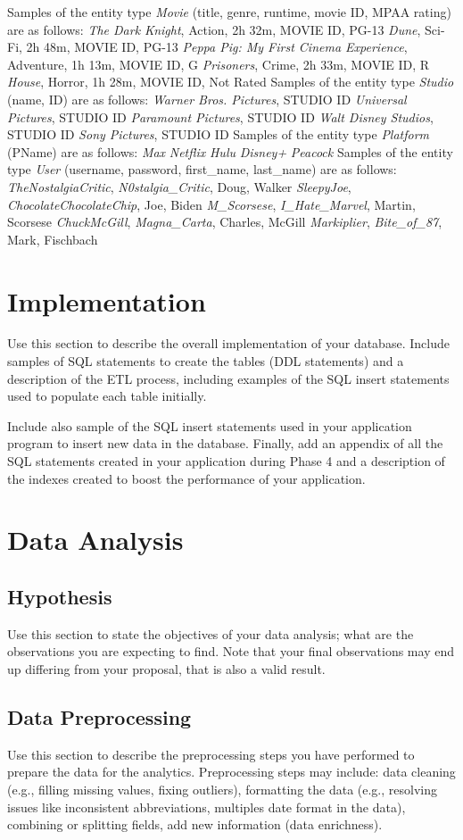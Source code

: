 \documentclass[12pt]{article}
\begin{document}
Samples of the entity type \emph{Movie} (title, genre, runtime, movie ID, MPAA rating) are as follows:
\emph{The Dark Knight}, Action, 2h 32m, MOVIE ID, PG-13
\emph{Dune}, Sci-Fi, 2h 48m, MOVIE ID, PG-13
\emph{Peppa Pig: My First Cinema Experience}, Adventure, 1h 13m, MOVIE ID, G
\emph{Prisoners}, Crime, 2h 33m, MOVIE ID, R
\emph{House}, Horror, 1h 28m, MOVIE ID, Not Rated
Samples of the entity type \emph{Studio} (name, ID) are as follows:
\emph{Warner Bros. Pictures}, STUDIO ID
\emph{Universal Pictures}, STUDIO ID
\emph{Paramount Pictures}, STUDIO ID
\emph{Walt Disney Studios}, STUDIO ID
\emph{Sony Pictures}, STUDIO ID
Samples of the entity type \emph{Platform} (PName) are as follows:
\emph{Max}
\emph{Netflix}
\emph{Hulu}
\emph{Disney+}
\emph{Peacock}
Samples of the entity type \emph{User} (username, password, first_name, last_name) are as follows:
\emph{TheNostalgiaCritic}, \emph{N0stalgia_Critic}, Doug, Walker
\emph{SleepyJoe}, \emph{ChocolateChocolateChip}, Joe, Biden
\emph{M_Scorsese}, \emph{I_Hate_Marvel}, Martin, Scorsese
\emph{ChuckMcGill}, \emph{Magna_Carta}, Charles, McGill 
\emph{Markiplier}, \emph{Bite_of_87}, Mark, Fischbach

\section{Implementation}
Use this section to describe the overall implementation of your database. Include samples of SQL statements to create the tables (DDL statements) and a description of the ETL process, including examples of the SQL insert statements used to populate each table initially.

Include also sample of the SQL insert statements used in your application program to insert new data in the database. Finally, add an appendix of all the SQL statements created in your application during Phase 4 and a description of the indexes created to boost the performance of your application.
\section{Data Analysis}
\subsection{Hypothesis}
Use this section to state the objectives of your data analysis; what are the observations you are expecting to find. Note that your final
observations may end up differing from your proposal, that is also a valid result.
\subsection{Data Preprocessing}
Use this section to describe the preprocessing steps you have performed to prepare the data for the analytics. Preprocessing steps may include: data cleaning (e.g., filling missing values, fixing outliers), formatting the data (e.g., resolving issues like inconsistent abbreviations, multiples date format in the data), combining or splitting fields, add new information (data enrichness).
\end{document}

